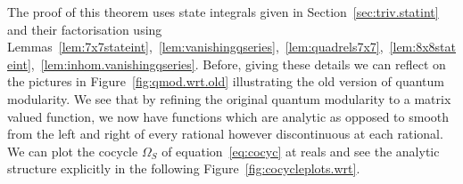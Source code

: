 \documentclass[pdftex]{sigma}
\numberwithin{equation}{section}
\def\tq{\tilde{q}}
\def\ms{\mathbf{j}}
\def\Om{\Omega}
\def\tq{\tilde{q}}
\def\Re{\operatorname{Re}}
\def\Om{\Omega}
\begin{document}
The proof of this theorem uses state integrals given in Section~\ref{sec:triv.statint} and their factorisation using Lemmas~\ref{lem:7x7stateint},~\ref{lem:vanishingqseries},~\ref{lem:quadrels7x7},~\ref{lem:8x8stateint},~\ref{lem:inhom.vanishingqseries}. Before, giving these details we can reflect on the pictures in Figure~\ref{fig:qmod.wrt.old} illustrating the old version of quantum modularity. We see that by refining the original quantum modularity to a matrix valued function, we now have functions which are analytic as opposed to smooth from the left and right of every rational however discontinuous at each rational. We can plot the cocycle $\Om_{S}$ of equation~\eqref{eq:cocyc} at reals and see the analytic structure explicitly in the following Figure~\ref{fig:cocycleplots.wrt}.
\begin{figure}[t]\centering
{}
\end{figure}
\end{document}
